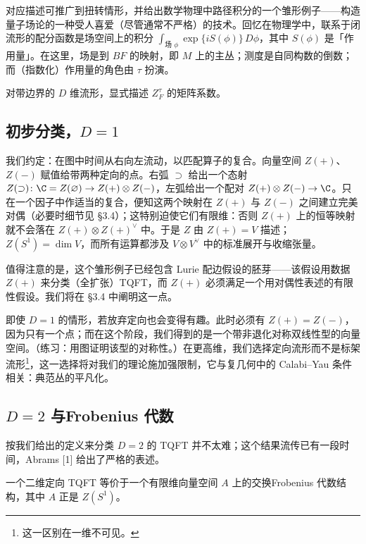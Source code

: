 对应描述可推广到扭转情形，并给出数学物理中路径积分的一个雏形例子——构造量子场论的一种受人喜爱（尽管通常不严格）的技术。回忆在物理学中，联系于闭流形的配分函数是场空间上的积分 $\int_{\text{场 }\phi}\exp\{iS(\phi)\}\,D\phi$，其中 $S(\phi)$ 是「作用量」。在这里，场是到 $BF$ 的映射，即 $M$ 上的主丛；测度是自同构数的倒数；而（指数化）作用量的角色由 $\tau$ 扮演。

\begin{exercise}
对带边界的 $D$ 维流形，显式描述 $Z^\tau_F$ 的矩阵系数。
\end{exercise}

\subsection{初步分类，$D=1$}

我们约定：在图中时间从右向左流动，以匹配算子的复合。向量空间 $Z(+)$、$Z(-)$ 赋值给带两种定向的点。右弧 $\supset$ 给出一个态射 $Z(\supset)\colon\C=Z(\varnothing)\to Z(+)\otimes Z(-)$，左弧给出一个配对 $Z(+)\otimes Z(-)\to\C$。只在一个因子中作适当的复合，便知这两个映射在 $Z(+)$ 与 $Z(-)$ 之间建立完美对偶（必要时细节见 §3.4）；这特别迫使它们有限维：否则 $Z(+)$ 上的恒等映射就不会落在 $Z(+)\otimes Z(+)^\vee$ 中。于是 $Z$ 由 $Z(+)=V$ 描述；$Z(S^1)=\dim V$，而所有运算都涉及 $V\otimes V^\vee$ 中的标准展开与收缩张量。

值得注意的是，这个雏形例子已经包含 Lurie 配边假设的胚芽——该假设用数据 $Z(+)$ 来分类（全扩张）TQFT，而 $Z(+)$ 必须满足一个用对偶性表述的有限性假设。我们将在 §3.4 中阐明这一点。

\begin{remark}[无定向情形]
即使 $D=1$ 的情形，若放弃定向也会变得有趣。此时必须有 $Z(+)=Z(-)$，因为只有一个点；而在这个阶段，我们得到的是一个带非退化对称双线性型的向量空间。（练习：用图证明该型的对称性。）在更高维，我们选择定向流形而不是标架流形\footnote{这一区别在一维不可见。}，这一选择将对我们的理论施加强限制，它与复几何中的 Calabi--Yau 条件相关：典范丛的平凡化。
\end{remark}

\subsection{$D=2$ 与Frobenius 代数}

按我们给出的定义来分类 $D=2$ 的 TQFT 并不太难；这个结果流传已有一段时间，Abrams [1] 给出了严格的表述。

\begin{theorem}
一个二维定向 TQFT 等价于一个有限维向量空间 $A$ 上的交换Frobenius 代数结构，其中 $A$ 正是 $Z(S^1)$。
\end{theorem}

